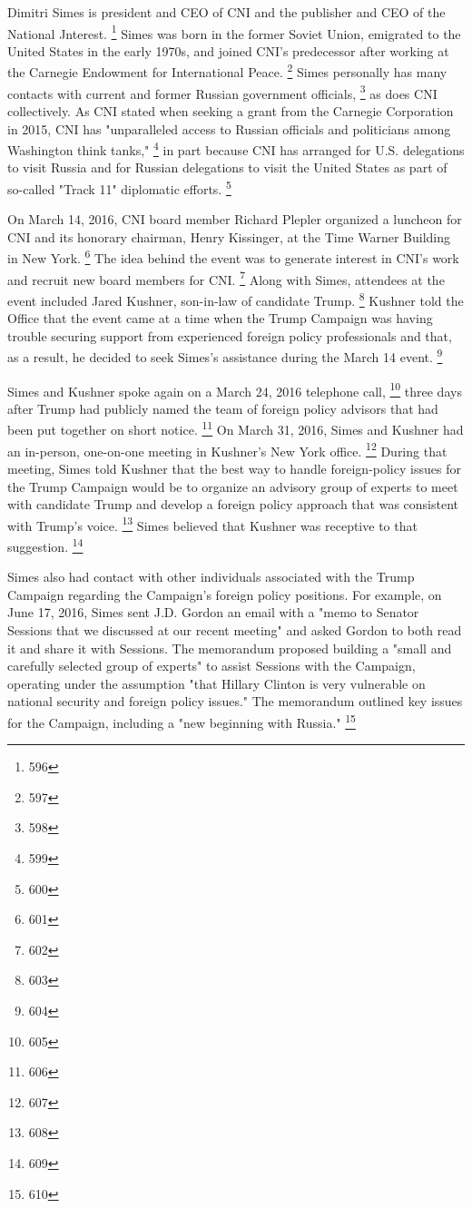Dimitri Simes is president and CEO of CNI and the publisher and CEO of the National Jnterest.%
\footnote{596}
Simes was born in the former Soviet Union, emigrated to the United States in the early 1970s, and joined CNI's predecessor after working at the Carnegie Endowment for International Peace.%
\footnote{597}
Simes personally has many contacts with current and former Russian government officials,%
\footnote{598}
as does CNI collectively.
As CNI stated when seeking a grant from the Carnegie Corporation in 2015, CNI has "unparalleled access to Russian officials and politicians among Washington think tanks,"%
\footnote{599}
in part because CNI has arranged for U.S. delegations to visit Russia and for Russian delegations to visit the United States as part of so-called "Track 11" diplomatic efforts.%
\footnote{600}

On March 14, 2016, CNI board member Richard Plepler organized a luncheon for CNI and its honorary chairman, Henry Kissinger, at the Time Warner Building in New York.%
\footnote{601}
The idea behind the event was to generate interest in CNI's work and recruit new board members for CNI.%
\footnote{602}
Along with Simes, attendees at the event included Jared Kushner, son-in-law of candidate Trump.%
\footnote{603}
Kushner told the Office that the event came at a time when the Trump Campaign was having trouble securing support from experienced foreign policy professionals and that, as a result, he decided to seek Simes's assistance during the March 14 event.%
\footnote{604}

Simes and Kushner spoke again on a March 24, 2016 telephone call,%
\footnote{605}
three days after Trump had publicly named the team of foreign policy advisors that had been put together on short notice.%
\footnote{606}
On March 31, 2016, Simes and Kushner had an in-person, one-on-one meeting in Kushner's New York office.%
\footnote{607}
During that meeting, Simes told Kushner that the best way to handle foreign-policy issues for the Trump Campaign would be to organize an advisory group of experts to meet with candidate Trump and develop a foreign policy approach that was consistent with Trump's voice.%
\footnote{608}
Simes believed that Kushner was receptive to that suggestion.%
\footnote{609}

Simes also had contact with other individuals associated with the Trump Campaign regarding the Campaign's foreign policy positions.
For example, on June 17, 2016, Simes sent J.D. Gordon an email with a "memo to Senator Sessions that we discussed at our recent meeting" and asked Gordon to both read it and share it with Sessions.
The memorandum proposed building a "small and carefully selected group of experts" to assist Sessions with the Campaign, operating under the assumption "that Hillary Clinton is very vulnerable on national security and foreign policy issues."
The memorandum outlined key issues for the Campaign, including a "new beginning with Russia."%
\footnote{610}

